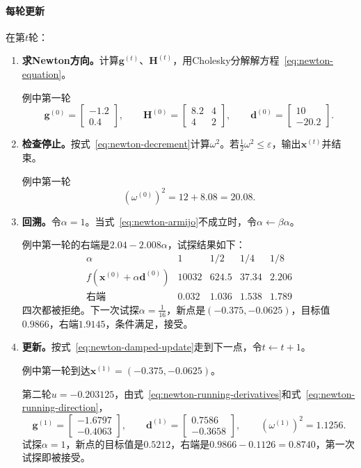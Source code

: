 \paragraph{每轮更新}
在第$t$轮：
\begin{enumerate}
 \item \textbf{求Newton方向。}计算$\bm{g}^{(t)}$、$\bm{H}^{(t)}$，用Cholesky分解解方程~\eqref{eq:newton-equation}。

 例中第一轮
 \[
  \bm{g}^{(0)}=\begin{bmatrix}-1.2\\0.4\end{bmatrix},\qquad
  \bm{H}^{(0)}=\begin{bmatrix}8.2&4\\4&2\end{bmatrix},\qquad
  \bm{d}^{(0)}=\begin{bmatrix}10\\-20.2\end{bmatrix}.
 \]

 \item \textbf{检查停止。}按式~\eqref{eq:newton-decrement}计算$\omega^2$。若$\tfrac12\omega^2\leq\varepsilon$，输出$\bm{x}^{(t)}$并结束。

 例中第一轮
 \[
  (\omega^{(0)})^2=12+8.08=20.08.
 \]

 \item \textbf{回溯。}令$\alpha=1$。当式~\eqref{eq:newton-armijo}不成立时，令$\alpha\leftarrow\beta\alpha$。

 例中第一轮的右端是$2.04-2.008\alpha$，试探结果如下：
 \[
  \begin{array}{ccccc}
   \alpha&1&1/2&1/4&1/8\\
   f(\bm{x}^{(0)}+\alpha\bm{d}^{(0)})&10032&624.5&37.34&2.206\\
   \text{右端}&0.032&1.036&1.538&1.789
  \end{array}
 \]
 四次都被拒绝。下一次试探$\alpha=\tfrac1{16}$，新点是$(-0.375,-0.0625)$，目标值$0.9866$，右端$1.9145$，条件满足，接受。

 \item \textbf{更新。}按式~\eqref{eq:newton-damped-update}走到下一点，令$t\leftarrow t+1$。

 例中第一轮到达$\bm{x}^{(1)}=(-0.375,-0.0625)$。

 第二轮$u=-0.203125$，由式~\eqref{eq:newton-running-derivatives}和式~\eqref{eq:newton-running-direction}，
 \[
  \bm{g}^{(1)}=\begin{bmatrix}-1.6797\\-0.4063\end{bmatrix},\qquad
  \bm{d}^{(1)}=\begin{bmatrix}0.7586\\-0.3658\end{bmatrix},\qquad
  (\omega^{(1)})^2=1.1256.
 \]
 试探$\alpha=1$，新点的目标值是$0.5212$，右端是$0.9866-0.1126=0.8740$，第一次试探即被接受。
\end{enumerate}

